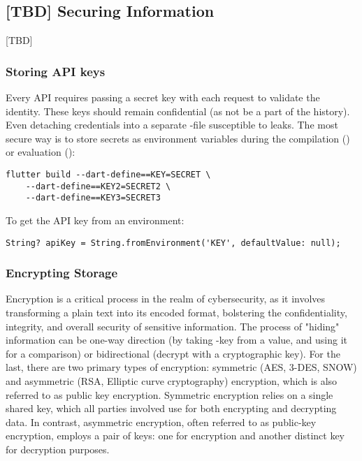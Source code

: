 
\subsection{[TBD] Securing Information}

[TBD]

\subsubsection{Storing API keys}

Every API requires passing a secret key with each request to validate the identity. These keys should remain 
confidential (as not be a part of the  history). Even detaching credentials into a separate -file  
susceptible to leaks. The most secure way is to store secrets as environment variables during the compilation 
() or evaluation ():

\begin{lstlisting}[language=terminal]
flutter build --dart-define==KEY=SECRET \
    --dart-define==KEY2=SECRET2 \
    --dart-define==KEY3=SECRET3
\end{lstlisting}

\noindent To get the API key from an environment:

\begin{lstlisting}
String? apiKey = String.fromEnvironment('KEY', defaultValue: null);
\end{lstlisting}


\subsubsection{Encrypting Storage}

Encryption is a critical process in the realm of cybersecurity, as it involves transforming a plain text into its 
encoded format, bolstering the confidentiality, integrity, and overall security of sensitive information. The process 
of "hiding" information can be one-way direction (by taking \q{hash}-key from a value, and using it for a comparison) 
or bidirectional (decrypt with a cryptographic key). For the last, there are two primary types of encryption: symmetric 
(AES, 3-DES, SNOW) and asymmetric (RSA, Elliptic curve cryptography) encryption, which is also referred to as public 
key encryption. Symmetric encryption relies on a single shared key, which all parties involved use for both encrypting 
and decrypting data. In contrast, asymmetric encryption, often referred to as public-key encryption, employs a pair of 
keys: one for encryption and another distinct key for decryption purposes.

